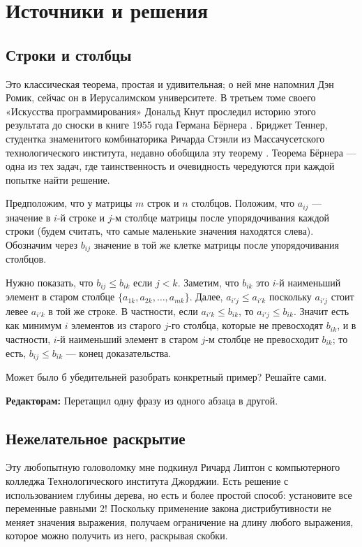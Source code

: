 \section*{Источники и решения}

\subsection*{Строки и столбцы}

Это классическая теорема, простая и удивительная; о ней мне напомнил Дэн Ромик, сейчас он в Иерусалимском университете.
В третьем томе своего «Искусства программирования» \cite{41} Дональд Кнут проследил историю этого результата до сноски в книге 1955 года Германа Бёрнера \cite{7}.
Бриджет Теннер, студентка знаменитого комбинаторика Ричарда Стэнли из Массачусетского технологического института, недавно обобщила эту теорему \cite{57}.
Теорема Бёрнера --- одна из тех задач, где таинственность и очевидность чередуются при каждой попытке найти решение.

Предположим, что у матрицы $m$ строк и $n$ столбцов.
Положим, что $a_{ij}$ --- значение в $i$-й строке и $j$-м столбце матрицы
после упорядочивания каждой строки (будем считать, что самые маленькие значения находятся слева).
Обозначим через $b_{ij}$ значение в той же клетке матрицы после упорядочивания столбцов.

Нужно показать, что $b_{ij} \le b_{ik}$ если $j < k$.
Заметим, что $b_{ik}$ это $i$-й наименьший элемент в старом столбце $\{a_{1k}, a_{2k}, \dots, a_{mk}\}$.
Далее, $a_{i'j}\le a_{i'k}$ поскольку $a_{i'j}$ стоит левее $a_{i'k}$ в той же строке.
В частности, если $a_{i'k}\le b_{ik}$, то $a_{i'j}\le b_{ik}$.
Значит есть как минимум $i$ элементов из старого $j$-го столбца, которые не превосходят $b_{ik}$,
и в частности, $i$-й наименьший элемент в старом $j$-м столбце не превосходит $b_{ik}$;
то есть, $b_{ij} \le b_{ik}$ --- конец доказательства.

Может было б убедительней разобрать конкретный пример?
Решайте сами.


\begin{addedbytheeditors}
\textbf{Редакторам:} Перетащил одну фразу из одного абзаца в другой.
\end{addedbytheeditors}

\subsection*{Нежелательное раскрытие}

Эту любопытную головоломку мне подкинул Ричард Липтон с компьютерного колледжа Технологического института Джорджии.
Есть решение с использованием глубины дерева, но есть и более простой способ:
установите все переменные равными 2!
Поскольку применение закона дистрибутивности не меняет значения выражения, получаем ограничение на длину любого выражения, которое можно получить из него, раскрывая скобки.


